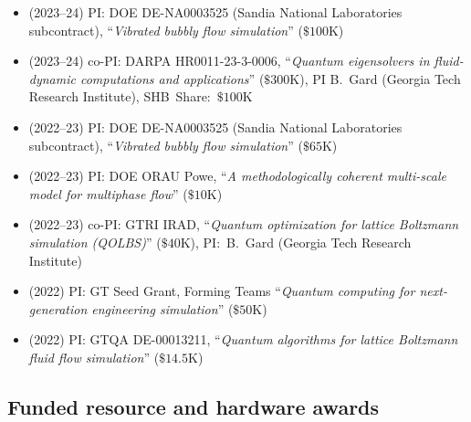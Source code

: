 \begin{itemize}
    \item (2023--24) PI: DOE DE-NA0003525 (Sandia National Laboratories subcontract), ``\textit{Vibrated bubbly flow simulation}'' ($\$100$K)
    \item (2023--24) co-PI: DARPA HR0011-23-3-0006, ``\textit{Quantum eigensolvers in fluid-dynamic computations and applications}'' ($\$300$K), PI B.~Gard (Georgia Tech Research Institute), SHB~Share:~$\$100$K
    \item (2022--23) PI: DOE DE-NA0003525 (Sandia National Laboratories subcontract), ``\textit{Vibrated bubbly flow simulation}'' ($\$65$K)
    \item (2022--23) PI: DOE ORAU Powe, ``\textit{A methodologically coherent multi-scale model for multiphase flow}'' ($\$10$K)
    \item (2022--23) co-PI: GTRI IRAD, ``\textit{Quantum optimization for lattice Boltzmann simulation (QOLBS)}'' ($\$40$K), PI:~B.~Gard (Georgia Tech Research Institute)
    \item (2022) PI: GT Seed Grant, Forming Teams ``\textit{Quantum computing for next-generation engineering simulation}'' ($\$50$K)
    \item (2022) PI: GTQA DE-00013211, ``\textit{Quantum algorithms for lattice Boltzmann fluid flow simulation}'' ($\$14.5$K)
\end{itemize}

\subsection{Funded resource and hardware awards}

